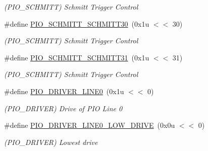 \begin{DoxyCompactItemize}
\begin{DoxyCompactList}\small\item\em (P\+I\+O\+\_\+\+S\+C\+H\+M\+I\+TT) Schmitt Trigger Control \end{DoxyCompactList}\item 
\mbox{\label{group__SAME70__PIO_gaf2bb44849b6f31453b677ff9b6cc8378}} 
\#define \mbox{\hyperlink{group__SAME70__PIO_gaf2bb44849b6f31453b677ff9b6cc8378}{P\+I\+O\+\_\+\+S\+C\+H\+M\+I\+T\+T\+\_\+\+S\+C\+H\+M\+I\+T\+T30}}~(0x1u $<$$<$ 30)
\begin{DoxyCompactList}\small\item\em (P\+I\+O\+\_\+\+S\+C\+H\+M\+I\+TT) Schmitt Trigger Control \end{DoxyCompactList}\item 
\mbox{\label{group__SAME70__PIO_ga6e090e0abaa4744c63b94001aa7f59af}} 
\#define \mbox{\hyperlink{group__SAME70__PIO_ga6e090e0abaa4744c63b94001aa7f59af}{P\+I\+O\+\_\+\+S\+C\+H\+M\+I\+T\+T\+\_\+\+S\+C\+H\+M\+I\+T\+T31}}~(0x1u $<$$<$ 31)
\begin{DoxyCompactList}\small\item\em (P\+I\+O\+\_\+\+S\+C\+H\+M\+I\+TT) Schmitt Trigger Control \end{DoxyCompactList}\item 
\mbox{\label{group__SAME70__PIO_ga0bb8a6cb8869606acd6f1dd8b13babb2}} 
\#define \mbox{\hyperlink{group__SAME70__PIO_ga0bb8a6cb8869606acd6f1dd8b13babb2}{P\+I\+O\+\_\+\+D\+R\+I\+V\+E\+R\+\_\+\+L\+I\+N\+E0}}~(0x1u $<$$<$ 0)
\begin{DoxyCompactList}\small\item\em (P\+I\+O\+\_\+\+D\+R\+I\+V\+ER) Drive of P\+IO Line 0 \end{DoxyCompactList}\item 
\mbox{\label{group__SAME70__PIO_ga7078cbfb7bd12e566ccfa09fb89bec49}} 
\#define \mbox{\hyperlink{group__SAME70__PIO_ga7078cbfb7bd12e566ccfa09fb89bec49}{P\+I\+O\+\_\+\+D\+R\+I\+V\+E\+R\+\_\+\+L\+I\+N\+E0\+\_\+\+L\+O\+W\+\_\+\+D\+R\+I\+VE}}~(0x0u $<$$<$ 0)
\begin{DoxyCompactList}\small\item\em (P\+I\+O\+\_\+\+D\+R\+I\+V\+ER) Lowest drive \end{DoxyCompactList}\item 

\end{DoxyCompactItemize}

